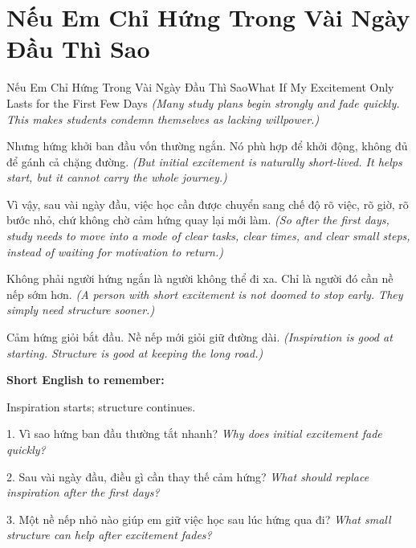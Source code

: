 \section{Nếu Em Chỉ Hứng Trong Vài Ngày Đầu Thì Sao}
\begin{truyen}{Nếu Em Chỉ Hứng Trong Vài Ngày Đầu Thì Sao}{What If My Excitement Only Lasts for the First Few Days}
\textit{(Many study plans begin strongly and fade quickly. This makes students condemn themselves as lacking willpower.)}

Nhưng hứng khởi ban đầu vốn thường ngắn. Nó phù hợp để khởi động, không đủ để gánh cả chặng đường.
\textit{(But initial excitement is naturally short-lived. It helps start, but it cannot carry the whole journey.)}

Vì vậy, sau vài ngày đầu, việc học cần được chuyển sang chế độ rõ việc, rõ giờ, rõ bước nhỏ, chứ không chờ cảm hứng quay lại mới làm.
\textit{(So after the first days, study needs to move into a mode of clear tasks, clear times, and clear small steps, instead of waiting for motivation to return.)}

Không phải người hứng ngắn là người không thể đi xa. Chỉ là người đó cần nề nếp sớm hơn.
\textit{(A person with short excitement is not doomed to stop early. They simply need structure sooner.)}
\end{truyen}

\begin{baihoc}
Cảm hứng giỏi bắt đầu. Nề nếp mới giỏi giữ đường dài.
\textit{(Inspiration is good at starting. Structure is good at keeping the long road.)}
\end{baihoc}

\begin{ghinhoanh}
\textbf{Short English to remember:}

Inspiration starts; structure continues.

\end{ghinhoanh}

\begin{tuhocnhanh}
1. Vì sao hứng ban đầu thường tắt nhanh? \textit{Why does initial excitement fade quickly?}

2. Sau vài ngày đầu, điều gì cần thay thế cảm hứng? \textit{What should replace inspiration after the first days?}

3. Một nề nếp nhỏ nào giúp em giữ việc học sau lúc hứng qua đi? \textit{What small structure can help after excitement fades?}
\end{tuhocnhanh}
\ngancach

